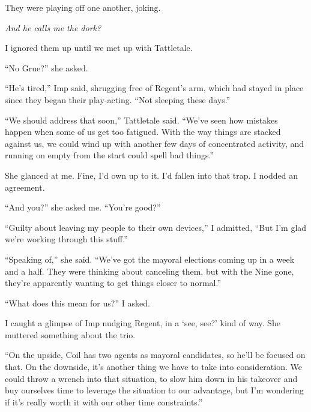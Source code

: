 They were playing off one another, joking.



\emph{And he calls me the dork?}



I ignored them up until we met up with Tattletale.



``No Grue?'' she asked.



``He's tired,'' Imp said, shrugging free of Regent's arm, which had stayed in place since they began their play-acting.  ``Not sleeping these days.''



``We should address that soon,'' Tattletale said.  ``We've seen how mistakes happen when some of us get too fatigued.  With the way things are stacked against us, we could wind up with another few days of concentrated activity, and running on empty from the start could spell bad things.''



She glanced at me.  Fine, I'd own up to it.  I'd fallen into that trap.  I nodded an agreement.



``And you?'' she asked me.  ``You're good?''



``Guilty about leaving my people to their own devices,'' I admitted, ``But I'm glad we're working through this stuff.''



``Speaking of,'' she said.  ``We've got the mayoral elections coming up in a week and a half.  They were thinking about canceling them, but with the Nine gone, they're apparently wanting to get things closer to normal.''



``What does this mean for us?'' I asked.



I caught a glimpse of Imp nudging Regent, in a `see, see?' kind of way.  She muttered something about the trio.



``On the upside, Coil has two agents as mayoral candidates, so he'll be focused on that.  On the downside, it's another thing we have to take into consideration.  We could throw a wrench into that situation, to slow him down in his takeover and buy ourselves time to leverage the situation to our advantage, but I'm wondering if it's really worth it with our other time constraints.''



